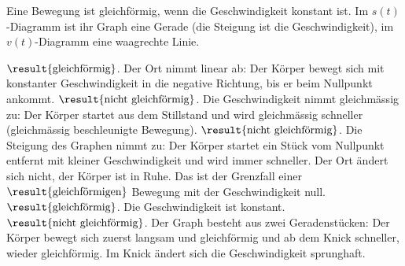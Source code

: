 Eine Bewegung ist gleichförmig, wenn die Geschwindigkeit konstant ist. Im $s(t)$-Diagramm ist ihr Graph eine Gerade (die Steigung ist die Geschwindigkeit), im $v(t)$-Diagramm eine waagrechte Linie.
\begin{abcliste}
\abc $\result{\text{gleichförmig}}$. Der Ort nimmt linear ab: Der Körper bewegt sich mit konstanter Geschwindigkeit in die negative Richtung, bis er beim Nullpunkt ankommt.
\abc $\result{\text{nicht gleichförmig}}$. Die Geschwindigkeit nimmt gleichmässig zu: Der Körper startet aus dem Stillstand und wird gleichmässig schneller (gleichmässig beschleunigte Bewegung).
\abc $\result{\text{nicht gleichförmig}}$. Die Steigung des Graphen nimmt zu: Der Körper startet ein Stück vom Nullpunkt entfernt mit kleiner Geschwindigkeit und wird immer schneller.
\abc Der Ort ändert sich nicht, der Körper ist in Ruhe. Das ist der Grenzfall einer $\result{\text{gleichförmigen}}$ Bewegung mit der Geschwindigkeit null.
\abc $\result{\text{gleichförmig}}$. Die Geschwindigkeit ist konstant.
\abc $\result{\text{nicht gleichförmig}}$. Der Graph besteht aus zwei Geradenstücken: Der Körper bewegt sich zuerst langsam und gleichförmig und ab dem Knick schneller, wieder gleichförmig. Im Knick ändert sich die Geschwindigkeit sprunghaft.
\end{abcliste}
